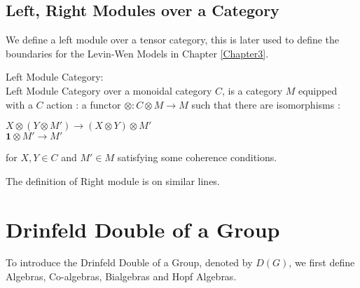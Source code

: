 \subsection{Left, Right Modules over a Category}
We define a left module over a tensor category, this is later used to define the boundaries for the Levin-Wen Models in Chapter \ref{Chapter3}.

\begin{defn}
Left Module Category:\\
      Left Module Category over a monoidal category $C$, is a category $M$ equipped with a $C$ action : a functor $\otimes : C \otimes M \rightarrow M$ such that
there are isomorphisms :
\begin{center}
 $ X \otimes (Y \otimes M') \rightarrow (X \otimes Y) \otimes M' $\\
 $ \textbf{1} \otimes M' \rightarrow M'$
\end{center}
for $X, Y \in C$ and $M' \in M$ satisfying some coherence conditions.
\end{defn}

The definition of Right module is on similar lines.







\section{Drinfeld Double of a Group}
    To introduce the Drinfeld Double of a Group, denoted by $D(G)$, we first define Algebras, Co-algebras, Bialgebras and Hopf Algebras.
    

